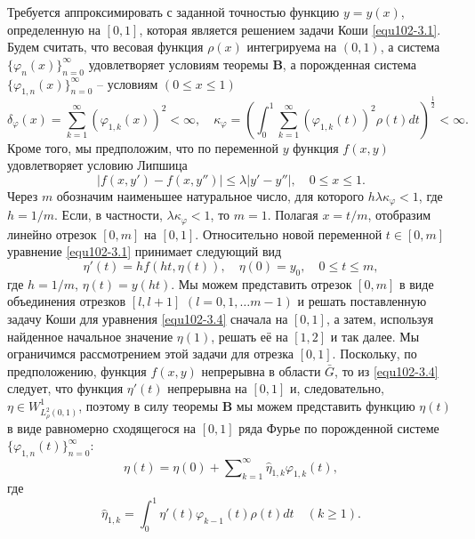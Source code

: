   Требуется аппроксимировать с заданной точностью  функцию $y=y(x)$, определенную на $[0,1]$, которая является решением задачи Коши \eqref{equ102-3.1}.
Будем считать, что весовая функция $\rho(x)$ интегрируема на $(0,1)$, а система $\{\varphi_{n}(x)\}_{n=0}^\infty$ удовлетворяет условиям теоремы \textbf{ B}, а порожденная система $\{\varphi_{1,n}(x)\}_{n=0}^\infty$ -- условиям $(0\le x\le 1)$
\begin{equation}\label{equ102-3.2}
\delta_\varphi(x)=\sum_{k=1}^{\infty}(\varphi_{1,k}(x))^2<\infty,\quad
\kappa_{\varphi}=\left(\int_0^1\sum_{k=1}^{\infty}
(\varphi_{1,k}(t))^2\rho(t)dt\right)^{\frac12}<\infty.
\end{equation}
Кроме того, мы предположим, что по переменной $y$ функция $f(x,y)$ удовлетворяет условию Липшица
 \begin{equation}\label{equ102-3.3}
|f(x,y')-f(x,y'')|\le \lambda|y'-y''|, \quad 0\le x \le 1.
\end{equation}
Через $m$ обозначим наименьшее натуральное число, для которого $h\lambda\kappa_\varphi<1$, где $h=1/m$. Если, в частности, $\lambda\kappa_\varphi<1$, то $m=1$. Полагая $x=t/m$, отобразим линейно отрезок $[0,m]$ на $[0,1]$. Относительно новой переменной $t\in [0,m]$ уравнение \eqref{equ102-3.1} принимает следующий вид
\begin{equation}\label{equ102-3.4}
\eta'(t)=hf(ht,\eta(t)), \quad \eta(0)=y_0,\quad 0\le t\le m,
\end{equation}
где $h=1/m$, $\eta(t)=y(ht)$. Мы можем представить отрезок $[0,m]$ в виде объединения отрезков $[l,l+1]$ $(l=0,1,\ldots m-1)$ и  решать поставленную задачу Коши для уравнения \eqref{equ102-3.4} сначала на $[0,1]$, а затем, используя найденное начальное значение $\eta(1)$,  решать её на $[1,2]$ и так далее. Мы ограничимся рассмотрением этой задачи для отрезка $[0,1]$. Поскольку, по предположению, функция $f(x,y)$ непрерывна в области $\bar G$, то из \eqref{equ102-3.4} следует, что  функция $\eta'(t)$ непрерывна на $[0,1]$ и, следовательно, $\eta\in W_{L_\rho^2(0,1)}^1$, поэтому в силу теоремы \textbf{ B}  мы можем представить  функцию $\eta(t)$ в виде равномерно сходящегося на $[0,1]$ ряда Фурье по порожденной системе $\{\varphi_{1,n}(t)\}_{n=0}^\infty$:
\begin{equation}\label{equ102-3.5}
\eta(t)= \eta(0)+ \sum\nolimits_{k=1}^\infty \hat \eta_{1,k}\varphi_{1,k}(t),
\end{equation}
где
  \begin{equation}\label{equ102-3.6}
\hat \eta_{1,k}=\int_{0}^1 \eta'(t)\varphi_{k-1}(t)\rho(t)dt\quad(k\ge1).
\end{equation}
